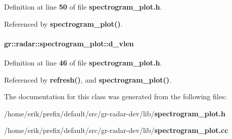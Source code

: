 Definition at line {\bf 50} of file {\bf spectrogram\+\_\+plot.\+h}.



Referenced by {\bf spectrogram\+\_\+plot()}.

\paragraph[{d\+\_\+vlen}]{ gr\+::radar\+::spectrogram\+\_\+plot\+::d\+\_\+vlen\hspace{0.3cm}{\ttfamily [private]}}\label{classgr_1_1radar_1_1spectrogram__plot_ac2281b92116b218e52bf92fa97f124a6}


Definition at line {\bf 46} of file {\bf spectrogram\+\_\+plot.\+h}.



Referenced by {\bf refresh()}, and {\bf spectrogram\+\_\+plot()}.



The documentation for this class was generated from the following files\+:\begin{DoxyCompactItemize}
\item 
/home/erik/prefix/default/src/gr-\/radar-\/dev/lib/{\bf spectrogram\+\_\+plot.\+h}\item 
/home/erik/prefix/default/src/gr-\/radar-\/dev/lib/{\bf spectrogram\+\_\+plot.\+cc}\end{DoxyCompactItemize}
